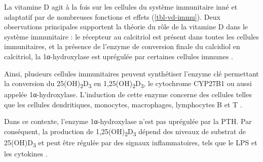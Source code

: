 \documentclass[
  a4paper,
  DIV=11,
  numbers=noendperiod,
  listof=totoc]{scrreprt}
\begin{document}
La vitamine D agit à la fois sur les cellules du système immunitaire
inné et adaptatif par de nombreuses fonctions et effets
(\cref{tbl-vd-immu}). Deux observations principales supportent la
théorie du rôle de la vitamine D dans le système immunitaire : le
récepteur au calcitriol est présent dans toutes les cellules
immunitaires, et la présence de l'enzyme de conversion finale du
calcidiol en calcitriol, la 1α-hydroxylase est uprégulée par certaines
cellules immunes \autocite{Giannini.2022}.

Ainsi, plusieurs cellules immunitaires peuvent synthétiser l'enzyme clé
permettant la conversion du 25(OH)\textsubscript{2}D\textsubscript{3} en
1,25(OH)\textsubscript{2}D\textsubscript{3}, le cytochrome CYP27B1 ou
aussi appelée 1α-hydroxylase. L'induction de cette enzyme concerne des
cellules telles que les cellules dendritiques, monocytes, macrophages,
lymphocytes B et T \autocites[ ]{Giannini.2022}{Dankers.2017}.

Dans ce contexte, l'enzyme 1α-hydroxylase n'est pas uprégulée par la
\ac{PTH}. Par conséquent, la production de
1,25(OH)\textsubscript{2}D\textsubscript{3} dépend des niveaux de
substrat de 25(OH)D\textsubscript{3} et peut être régulée par des
signaux inflammatoires, tels que le \ac{LPS} et les cytokines
\autocite{Giannini.2022}.
\end{document}
